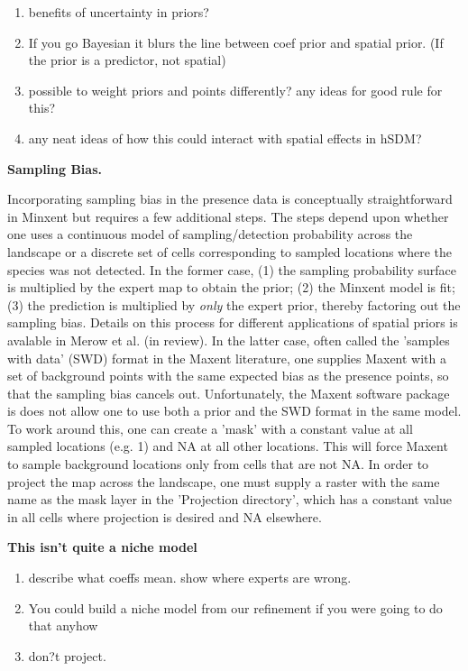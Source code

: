 \begin{enumerate}
  \item benefits of uncertainty in priors?
  \item If you go Bayesian it blurs the line between coef prior and spatial prior. (If the prior is a predictor, not spatial)
  \item possible to weight priors and points differently? any ideas for good rule for this?
  \item any neat ideas of how this could interact with spatial effects in hSDM?
\end{enumerate}


\textbf{Sampling Bias.} 

Incorporating sampling bias in the presence data is conceptually straightforward in Minxent but requires a few additional steps. The steps depend upon whether one uses a continuous model of sampling/detection probability across the landscape or a discrete set of cells corresponding to sampled locations where the species was not detected. In the former case, (1) the sampling probability surface is multiplied by the expert map to obtain the prior; (2) the Minxent model is fit; (3) the prediction is multiplied by \emph{only} the expert prior, thereby factoring out the sampling bias. Details on this process for different applications of spatial priors is avalable in Merow et al. (in review). In the latter case, often called the 'samples with data' (SWD) format in the Maxent literature, one supplies Maxent with a set of background points with the same expected bias as the presence points, so that the sampling bias cancels out. Unfortunately, the Maxent software package is does not allow one to use both a prior and the SWD format in the same model. To work around this, one can create a 'mask' with a constant value at all sampled locations (e.g. 1) and NA at all other locations. This will force Maxent to sample background locations only from cells that are not NA. In order to project the map across the landscape, one must supply a raster with the same name as the mask layer in the 'Projection directory', which has a constant value in all cells where projection is desired and NA elsewhere. 


\textbf{This isn't quite a niche model} 

\begin{enumerate}
  \item describe what coeffs mean. show where experts are wrong. 
  \item You could build a niche model from our refinement if you were going to do that anyhow
  \item  don?t project.
\end{enumerate}


